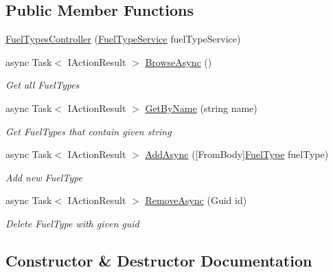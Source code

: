 \subsection*{Public Member Functions}
\begin{DoxyCompactItemize}
\item 
\mbox{\hyperlink{class_gasoline_1_1_api_1_1_controllers_1_1_fuel_types_controller_ad3c60df7f65b051db2e441e309a932fe}{Fuel\+Types\+Controller}} (\mbox{\hyperlink{class_gasoline_1_1_data_1_1_services_1_1_fuel_type_service}{Fuel\+Type\+Service}} fuel\+Type\+Service)
\item 
async Task$<$ I\+Action\+Result $>$ \mbox{\hyperlink{class_gasoline_1_1_api_1_1_controllers_1_1_fuel_types_controller_a49f976d4cfeeb60fc4c3028833a11d4e}{Browse\+Async}} ()
\begin{DoxyCompactList}\small\item\em Get all Fuel\+Types \end{DoxyCompactList}\item 
async Task$<$ I\+Action\+Result $>$ \mbox{\hyperlink{class_gasoline_1_1_api_1_1_controllers_1_1_fuel_types_controller_ae064a5c08e3ebf4f845e95f56ba06ea8}{Get\+By\+Name}} (string name)
\begin{DoxyCompactList}\small\item\em Get Fuel\+Types that contain given string \end{DoxyCompactList}\item 
async Task$<$ I\+Action\+Result $>$ \mbox{\hyperlink{class_gasoline_1_1_api_1_1_controllers_1_1_fuel_types_controller_ab8bb8c3e14d71a2b87335f0cd84274e3}{Add\+Async}} (\mbox{[}From\+Body\mbox{]}\mbox{\hyperlink{class_gasoline_1_1_data_1_1_models_1_1_fuel_type}{Fuel\+Type}} fuel\+Type)
\begin{DoxyCompactList}\small\item\em Add new Fuel\+Type \end{DoxyCompactList}\item 
async Task$<$ I\+Action\+Result $>$ \mbox{\hyperlink{class_gasoline_1_1_api_1_1_controllers_1_1_fuel_types_controller_a370af0dd01c9bd075e4c3cb5c4affb6b}{Remove\+Async}} (Guid id)
\begin{DoxyCompactList}\small\item\em Delete Fuel\+Type with given guid \end{DoxyCompactList}\end{DoxyCompactItemize}


\subsection{Constructor \& Destructor Documentation}
\mbox{\label{class_gasoline_1_1_api_1_1_controllers_1_1_fuel_types_controller_ad3c60df7f65b051db2e441e309a932fe}} 
